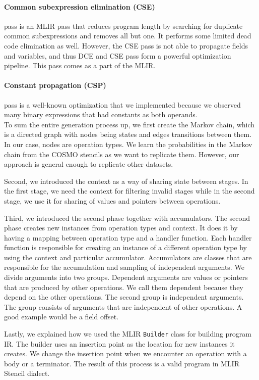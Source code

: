 \documentclass[sigplan,\review anonymous]{acmart}
\begin{document}
\paragraph{Common subexpression elimination (CSE)} pass is an MLIR pass that
reduces program length by searching for duplicate common subexpressions and
removes all but one. It performs some limited dead code elimination as well.
However, the CSE pass is not able to propagate fields and variables, and thus
DCE and CSE pass form a powerful optimization pipeline. This pass comes as a
part of the MLIR.

\paragraph{Constant propagation (CSP)} pass is a well-known optimization that
we implemented because we observed many binary expressions that had constants
as both operands.\\

To sum the entire generation process up, we first create the Markov chain,
which is a directed graph with nodes being states and edges transitions
between them. In our case, nodes are operation types. We learn the
probabilities in the Markov chain from the COSMO stencils as we want to
replicate them. However, our approach is general enough to replicate other
datasets. 

Second, we introduced the context as a way of sharing state between stages.
In the first stage, we need the context for filtering invalid stages while
in the second stage, we use it for sharing of values and pointers between
operations. 

Third, we introduced the second phase together with accumulators. The second
phase creates new instances from operation types and context. It does it by
having a mapping between operation type and a handler function. Each handler
function is responsible for creating an instance of a different operation
type by using the context and particular accumulator. Accumulators are
classes that are responsible for the accumulation and sampling of independent
arguments. We divide arguments into two groups. Dependent arguments are values
or pointers that are produced by other operations. We call them dependent
because they depend on the other operations. The second group is independent
arguments. The group consists of arguments that are independent of other
operations. A good example would be a field offset. 

Lastly, we explained how we used the MLIR \texttt{Builder} class for building
program IR. The builder uses an insertion point as the location for new
instances it creates. We change the insertion point when we encounter an
operation with a body or a terminator. The result of this process is a valid
program in MLIR Stencil dialect.
\end{document}

